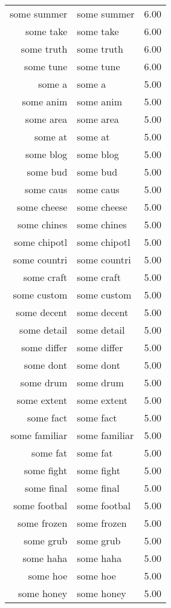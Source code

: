 \begin{table}[ht]
\begin{tabular}{rlr}
  some summer & some summer & 6.00 \\ 
  some take & some take & 6.00 \\ 
  some truth & some truth & 6.00 \\ 
  some tune & some tune & 6.00 \\ 
  some a & some a & 5.00 \\ 
  some anim & some anim & 5.00 \\ 
  some area & some area & 5.00 \\ 
  some at & some at & 5.00 \\ 
  some blog & some blog & 5.00 \\ 
  some bud & some bud & 5.00 \\ 
  some caus & some caus & 5.00 \\ 
  some cheese & some cheese & 5.00 \\ 
  some chines & some chines & 5.00 \\ 
  some chipotl & some chipotl & 5.00 \\ 
  some countri & some countri & 5.00 \\ 
  some craft & some craft & 5.00 \\ 
  some custom & some custom & 5.00 \\ 
  some decent & some decent & 5.00 \\ 
  some detail & some detail & 5.00 \\ 
  some differ & some differ & 5.00 \\ 
  some dont & some dont & 5.00 \\ 
  some drum & some drum & 5.00 \\ 
  some extent & some extent & 5.00 \\ 
  some fact & some fact & 5.00 \\ 
  some familiar & some familiar & 5.00 \\ 
  some fat & some fat & 5.00 \\ 
  some fight & some fight & 5.00 \\ 
  some final & some final & 5.00 \\ 
  some footbal & some footbal & 5.00 \\ 
  some frozen & some frozen & 5.00 \\ 
  some grub & some grub & 5.00 \\ 
  some haha & some haha & 5.00 \\ 
  some hoe & some hoe & 5.00 \\ 
  some honey & some honey & 5.00 \\ 

\end{tabular}
\end{table}

